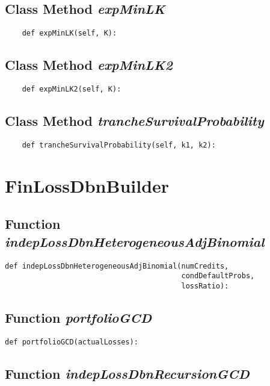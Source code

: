\documentclass[twoside,11pt]{book}
\begin{document}
\subsection{Class Method {\it expMinLK}}


\begin{lstlisting}
    def expMinLK(self, K):
\end{lstlisting}

\subsection{Class Method {\it expMinLK2}}


\begin{lstlisting}
    def expMinLK2(self, K):
\end{lstlisting}

\subsection{Class Method {\it trancheSurvivalProbability}}


\begin{lstlisting}
    def trancheSurvivalProbability(self, k1, k2):
\end{lstlisting}

\newpage
\section{FinLossDbnBuilder}

\subsection{Function {\it indepLossDbnHeterogeneousAdjBinomial}}


\begin{lstlisting}
def indepLossDbnHeterogeneousAdjBinomial(numCredits,
                                         condDefaultProbs,
                                         lossRatio):
\end{lstlisting}

\subsection{Function {\it portfolioGCD}}


\begin{lstlisting}
def portfolioGCD(actualLosses):
\end{lstlisting}

\subsection{Function {\it indepLossDbnRecursionGCD}}
\end{document}
